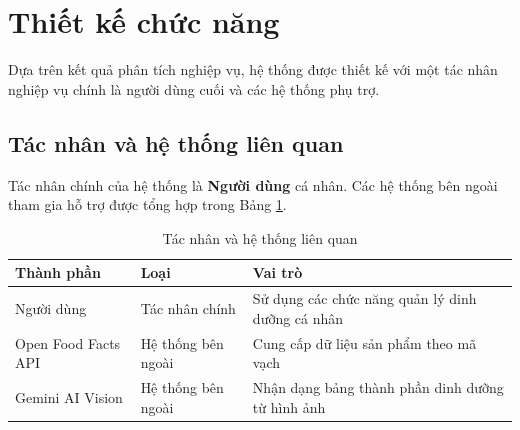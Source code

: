 \documentclass[12pt, a4paper]{report}
\begin{document}
\section{Thiết kế chức năng}
Dựa trên kết quả phân tích nghiệp vụ, hệ thống được thiết kế với một tác nhân nghiệp vụ chính là người dùng cuối và các hệ thống phụ trợ. 

\subsection{Tác nhân và hệ thống liên quan}
Tác nhân chính của hệ thống là \textbf{Người dùng} cá nhân. Các hệ thống bên ngoài tham gia hỗ trợ được tổng hợp trong Bảng \ref{tab:tac_nhan}.

\begin{table}[htbp]
\centering
\caption{Tác nhân và hệ thống liên quan}
\label{tab:tac_nhan}
\begin{tabular}{|>{\raggedright\arraybackslash}p{4cm}|>{\raggedright\arraybackslash}p{4cm}|p{7cm}|}
\hline
\textbf{Thành phần} & \textbf{Loại} & \textbf{Vai trò} \\
\hline
Người dùng & Tác nhân chính & Sử dụng các chức năng quản lý dinh dưỡng cá nhân \\
\hline
Open Food Facts API & Hệ thống bên ngoài & Cung cấp dữ liệu sản phẩm theo mã vạch \\
\hline
Gemini AI Vision & Hệ thống bên ngoài & Nhận dạng bảng thành phần dinh dưỡng từ hình ảnh \\
\hline
\end{tabular}
\end{table}
\end{document}
